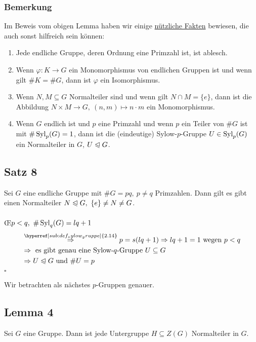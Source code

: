 \subsubsection*{Bemerkung}
Im Beweis vom obigen Lemma haben wir einige \uline{nützliche Fakten} bewiesen, die auch sonst hilfreich sein können:
\begin{enumerate}[(1)]
	\item Jede endliche Gruppe, deren Ordnung eine Primzahl ist, ist ablesch.
	\item Wenn $\varphi:K\to G$ ein Monomorphismus von endlichen Gruppen ist und wenn gilt $\#K=\#G$, dann ist $\varphi$ ein Isomorphismus.
	\item Wenn $N,M\subseteq G$ Normalteiler sind und wenn gilt $N\cap M=\{e\}$, dann ist die Abbildung $N\times M\to G,~(n,m)\mapsto n\cdot m$ ein Monomorphismus.
	\item Wenn $G$ endlich ist und $p$ eine Primzahl und wenn $p$ ein Teiler von $\#G$ ist mit $\#\operatorname{Syl}_p(G)=1$, dann ist die (eindeutige) Sylow-$p$-Gruppe $U\in \operatorname{Syl}_p(G)$ ein Normalteiler in $G$, $U\trianglelefteqslant G$.
\end{enumerate}


\subsection{Satz 8}
\label{sub:satz_8}
Sei $G$ eine endliche Gruppe mit $\#G=pq,~p\not=q$ Primzahlen.
Dann gilt es gibt einen Normalteiler $N\trianglelefteqslant G,~\{e\}\not=N\not=G$.\\

\\
\OE $p<q,~\#\operatorname{Syl}_q(G)=lq+1$
\begin{equation*}
\begin{aligned}
	&\stackrel{\hyperref[sub:def_sylow_gruppe]{2.14}}{\Rightarrow} p=s(lq+1) \Rightarrow lq+1=1 \text{ wegen } p<q\\
	&\Rightarrow \text{ es gibt genau eine Sylow-$q$-Gruppe } U\subseteq G\\
	&\Rightarrow U\nt G\text{ und } \#U=p
\end{aligned}
\end{equation*}
\hfill $\square$

Wir betrachten als nächstes $p$-Gruppen genauer.\\

\subsection{Lemma 4}
\label{sub:lemma_4}
Sei $G$ eine Gruppe. 
Dann ist jede Untergruppe $H\subseteq Z(G)$ Normalteiler in $G$.\\

